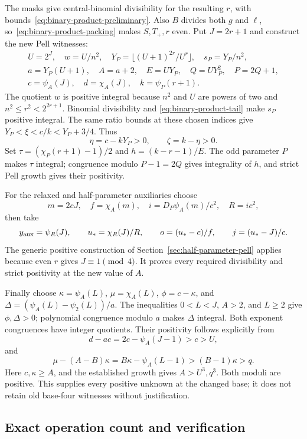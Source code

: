 The masks give central-binomial divisibility for the resulting $r$,
with bounds~\eqref{eq:binary-product-preliminary}. Also $B$ divides
both $g$ and $\ell$, so~\eqref{eq:binary-product-packing} makes
$S,T_+,r$ even. Put $J=2r+1$ and construct the new Pell witnesses:
\begin{equation}\label{eq:binary-product-necessary-pell}
\begin{gathered}
 U=2^J,\quad w=U/n^2,\quad
 Y_P=\lfloor(U+1)^{2r}/U^r\rfloor,\quad s_P=Y_P/n^2,\\
 a=Y_P(U+1),\quad A=a+2,\quad E=UY_P,\quad Q=UY_P^2,\quad
 P=2Q+1,\\
 c=\psi_A(J),\quad d=\chi_A(J),\quad k=\psi_P(r+1).
\end{gathered}
\end{equation}
The quotient $w$ is positive integral because $n^2$ and $U$ are
powers of two and $n^2\le r^2<2^{2r+1}$. Binomial divisibility and
\eqref{eq:binary-product-tail} make $s_P$ positive integral.
The same ratio bounds at these chosen indices give
$Y_P<\xi<c/k<Y_P+3/4$. Thus
\[
 \eta=c-kY_P>0,\qquad \zeta=k-\eta>0.
\]
Set $\tau=(\chi_P(r+1)-1)/2$ and
$h=(k-r-1)/E$. The odd parameter $P$ makes $\tau$ integral;
congruence modulo $P-1=2Q$ gives integrality of $h$, and strict
Pell growth gives their positivity.

For the relaxed and half-parameter auxiliaries choose
\[
 m=2cJ,\quad f=\chi_A(m),\quad
 i=D_P\psi_A(m)/c^2,\quad R=ic^2,
\]
then take
\[
 y_{\rm aux}=\psi_R(J),\qquad
 u_*=\chi_R(J)/R,\qquad
 o=(u_*-c)/f,\qquad j=(u_*-J)/c.
\]
The generic positive construction of
Section~\ref{sec:half-parameter-pell} applies because even $r$
gives $J\equiv1\pmod4$. It proves every required divisibility and
strict positivity at the new value of $A$.

Finally choose $\kappa=\psi_A(L)$, $\mu=\chi_A(L)$,
$\phi=c-\kappa$, and
$\Delta=(\psi_A(L)-\psi_2(L))/a$. The inequalities $0<L<J$,
$A>2$, and $L\ge2$ give $\phi,\Delta>0$; polynomial congruence
modulo $a$ makes $\Delta$ integral. Both exponent congruences have
integer quotients. Their positivity follows explicitly from
\[
 d-ac=2c-\psi_A(J-1)>c>U,
\]
and
\[
 \mu-(A-B)\kappa
   =B\kappa-\psi_A(L-1)>(B-1)\kappa>q.
\]
Here $c,\kappa\ge A$, and the established growth gives
$A>U^3,q^3$. Both moduli are positive. This supplies every positive
unknown at the changed base; it does not retain old base-four
witnesses without justification.

\subsection{Exact operation count and verification}

